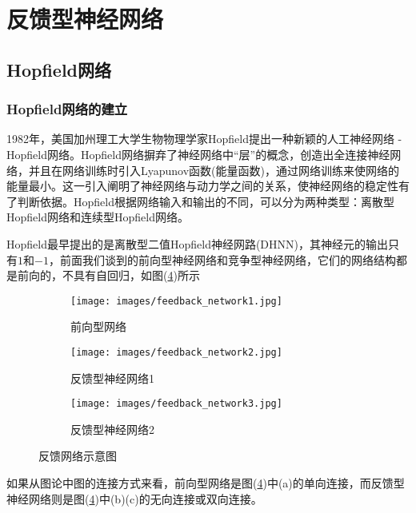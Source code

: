 \section{反馈型神经网络}
    \subsection{Hopfield网络}
        \subsubsection{Hopfield网络的建立}
            \par
            1982年，美国加州理工大学生物物理学家Hopfield提出一种新颖的人工神经网络 - Hopfield网络。Hopfield网络摒弃了神经网络中“层”的概念，创造出全连接神经网络，并且在网络训练时引入Lyapunov函数(能量函数)，通过网络训练来使网络的能量最小。这一引入阐明了神经网络与动力学之间的关系，使神经网络的稳定性有了判断依据。Hopfield根据网络输入和输出的不同，可以分为两种类型：离散型Hopfield网络和连续型Hopfield网络。
            \par
            Hopfield最早提出的是离散型二值Hopfield神经网路(DHNN)，其神经元的输出只有$1$和$-1$，前面我们谈到的前向型神经网络和竞争型神经网络，它们的网络结构都是前向的，不具有自回归，如图(\ref{fig:反馈网络示意图})所示
   			\begin{figure}[H]
    			\centering
    			\begin{subfigure}[b]{0.2\textwidth}
        			\texttt{[image: images/feedback\_network1.jpg]}
        			\caption{前向型网络}
        			\label{fig:前向型网络}
    			\end{subfigure}
    			\quad
    			\begin{subfigure}[b]{0.2\textwidth}
        			\texttt{[image: images/feedback\_network2.jpg]}
        			\caption{反馈型神经网络1}
        			\label{fig:反馈型神经网络1}
    			\end{subfigure}
    			\quad
    			\begin{subfigure}[b]{0.25\textwidth}
        			\texttt{[image: images/feedback\_network3.jpg]}
        			\caption{反馈型神经网络2}
        			\label{fig:反馈型神经网络2}
    			\end{subfigure}
    			\caption{反馈网络示意图}\label{fig:反馈网络示意图}
			\end{figure}
            如果从图论中图的连接方式来看，前向型网络是图(\ref{fig:反馈网络示意图})中(a)的单向连接，而反馈型神经网络则是图(\ref{fig:反馈网络示意图})中(b)(c)的无向连接或双向连接。
